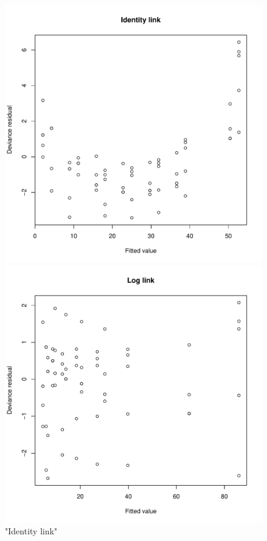 \documentclass[]{article}
\begin{document}
\begin{enumerate}
{\begin{figure}
	\includegraphics[width = \textwidth]{pic/HW2_4/d_res_ide}
	\caption{"Identity link"}
	\label{D_res_ide}
	\endminipage\hfill
	\includegraphics[width = \textwidth]{pic/HW2_4/d_res_log}

\end{figure}}
\end{enumerate}
\end{document}
